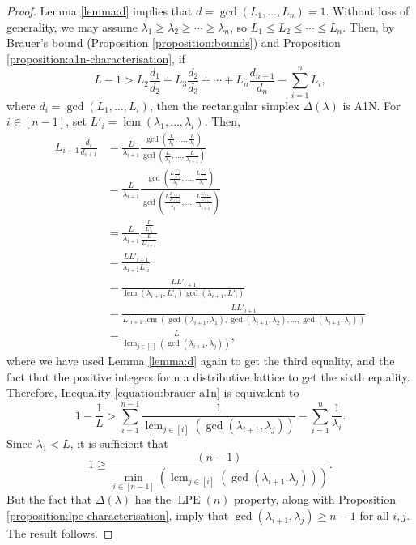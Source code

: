 \documentclass[a4paper,11pt]{amsart}
\theoremstyle{plain}
\theoremstyle{definition}
\theoremstyle{remark}
\DeclareMathOperator{\lcm}{lcm}
\DeclareMathOperator{\LPE}{LPE}
\begin{document}
\begin{proof}
    Lemma \ref{lemma:d} implies that $d = \gcd(L_1, \ldots, L_n) = 1$. Without loss of generality, we may assume $\lambda_1 \geq \lambda_2 \geq \cdots \geq \lambda_n$, so $L_1 \leq L_2 \leq \cdots \leq L_n$. Then, by Brauer's bound (Proposition \ref{proposition:bounds}) and Proposition \ref{proposition:a1n-characterisation}, if
    \begin{equation}\label{equation:brauer-a1n}
        L - 1 > L_2 \frac{d_1}{d_2} + L_3 \frac{d_2}{d_3} + \cdots + L_n \frac{d_{n - 1}}{d_n} - \sum_{i = 1}^n L_i,
    \end{equation}
    where $d_i = \gcd(L_1, \ldots, L_i)$, then the rectangular simplex $\Delta(\lambda)$ is A1N. For $i \in [n - 1]$, set $L'_i = \lcm(\lambda_1, \ldots, \lambda_i)$. Then,
    \begin{align*}
        L_{i + 1} \frac{d_i}{d_{i + 1}} &= \frac{L}{\lambda_{i + 1}} \frac{\gcd \left ( \frac{L}{\lambda_1}, \ldots, \frac{L}{\lambda_i} \right )}{\gcd \left ( \frac{L}{\lambda_1}, \ldots, \frac{L}{\lambda_{i + 1}} \right )} \\
        &= \frac{L}{\lambda_{i + 1}} \frac{\gcd \left ( \frac{L \frac{L'_i}{L'_i}}{\lambda_1}, \ldots, \frac{L\frac{L'_i}{L'_i}}{\lambda_i} \right )}{\gcd \left ( \frac{L\frac{L'_{i + 1}}{L'_{i + 1}}}{\lambda_1}, \ldots, \frac{L\frac{L'_{i + 1}}{L'_{i + 1}}}{\lambda_{i + 1}} \right )} \\
        &= \frac{L}{\lambda_{i + 1}} \frac{\frac{L}{L'_i}}{\frac{L}{L'_{i + 1}}} \\
        &= \frac{L L'_{i + 1}}{\lambda_{i + 1} L'_i} \\
        &= \frac{L L'_{i + 1}}{\lcm(\lambda_{i + 1}, L'_i)\gcd(\lambda_{i + 1}, L'_i)} \\
        &= \frac{L L'_{i + 1}}{L'_{i + 1} \lcm(\gcd(\lambda_{i + 1}, \lambda_1), \gcd(\lambda_{i + 1}, \lambda_2), \ldots, \gcd(\lambda_{i + 1}, \lambda_{i}))} \\
        &= \frac{L}{\lcm_{j \in [i]}(\gcd(\lambda_{i + 1}, \lambda_j))},
    \end{align*}
    where we have used Lemma \ref{lemma:d} again to get the third equality, and the fact that the positive integers form a distributive lattice to get the sixth equality. Therefore, Inequality \ref{equation:brauer-a1n} is equivalent to
    \[
        1 - \frac{1}{L} > \sum_{i = 1}^{n - 1} \frac{1}{\lcm_{j \in [i]}(\gcd(\lambda_{i + 1}, \lambda_j))} - \sum_{i = 1}^n \frac{1}{\lambda_i}.
    \]
    Since $\lambda_1 < L$, it is sufficient that
    \[
    1 \geq \frac{(n - 1)}{\min_{i \in [n - 1]}(\lcm_{j \in [i]}(\gcd(\lambda_{i + 1}. \lambda_j)))}.
    \]
    But the fact that $\Delta(\lambda)$ has the $\LPE(n)$ property, along with Proposition \ref{proposition:lpe-characterisation}, imply that $\gcd(\lambda_{i + 1}, \lambda_j) \geq n - 1$ for all $i, j$. The result follows.
\end{proof}
\end{document}
